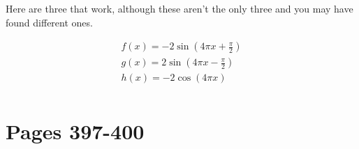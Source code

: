 \documentclass[fleqn,addpoints]{exam}
\begin{document}
\begin{solution}

Here are three that work, although these aren't the only three and you may have found different ones.

\begin{align*}
  f(x) = -2 \sin \left( 4 \pi x + \frac{\pi}{2} \right) \\
  g(x) = 2 \sin \left( 4 \pi x - \frac{\pi}{2} \right) \\
  h(x) = -2 \cos(4 \pi x) \\
\end{align*}
\end{solution}


\ifprintanswers
\section{Pages 397-400}
\end{document}
